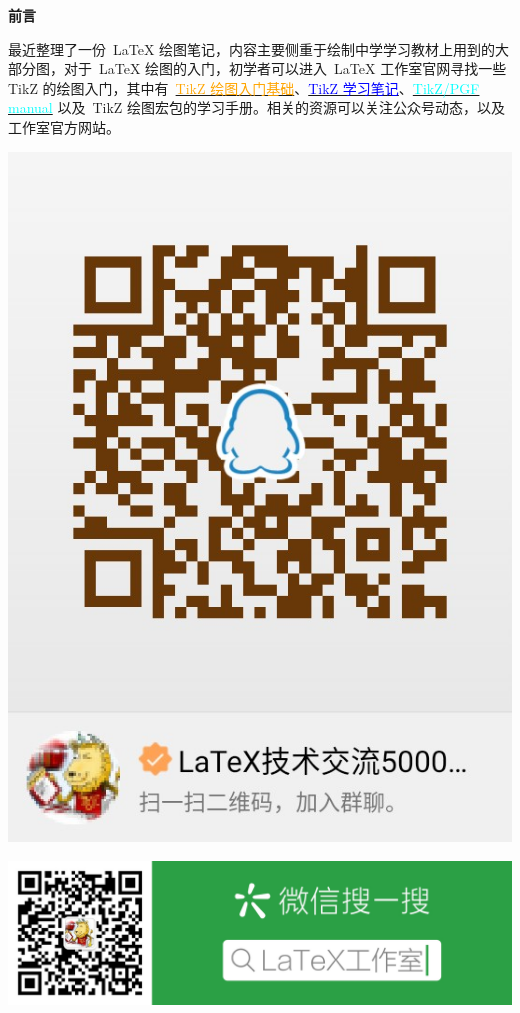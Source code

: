 \begin{center}
{\Large\bfseries 前言}
\end{center}

\qquad 最近整理了一份~\LaTeX{} 绘图笔记，内容主要侧重于绘制中学学习教材上用到的大部分图，对于~\LaTeX{} 绘图的入门，初学者可以进入~\LaTeX{} 工作室官网寻找一些 TikZ 的绘图入门，其中有~\href{https://www.latexstudio.net/index/details/index/mid/940.html}{\textcolor{orange}{TikZ 绘图入门基础}}、\href{https://www.latexstudio.net/index/details/index/mid/878.html} {\textcolor{blue}{TikZ 学习笔记}}、\href{https://www.latexstudio.net/index/details/index/mid/949.html} {\textcolor{cyan}{TikZ/PGF manual}} 以及~TikZ 绘图宏包的学习手册。相关的资源可以关注公众号动态，以及工作室官方网站。

\begin{multicols}{2}
\centerline{\includegraphics[scale=0.15]{fig2}}
\centerline{\includegraphics[scale=0.1]{fig1}}
\end{multicols}

